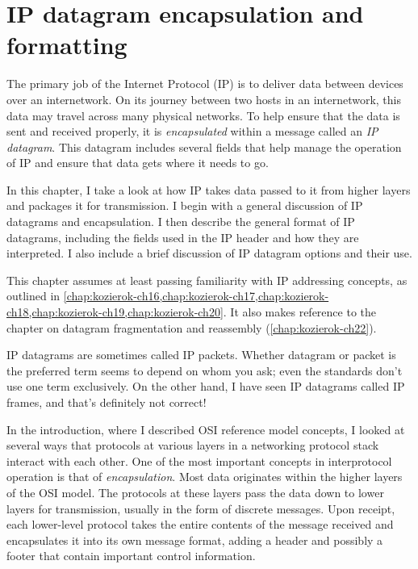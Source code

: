 \chapter{IP datagram encapsulation and formatting}
\label{chap:kozierok-ch21}


The primary job of the Internet Protocol (IP) is to deliver data between
devices over an internetwork. On its journey between two hosts in an
internetwork, this data may travel across many physical networks. To
help ensure that the data is sent and received properly, it is
\emph{encapsulated} within a message called an \emph{IP datagram}.
This datagram includes several fields that help manage the operation of
IP and ensure that data gets where it needs to go.

In this chapter, I take a look at how IP takes data passed to it from
higher layers and packages it for transmission. I begin with a general
discussion of IP datagrams and encapsulation. I then describe the
general format of IP datagrams, including the fields used in the IP
header and how they are interpreted. I also include a brief discussion
of IP datagram options and their use.


\begin{backgroundinfo}
This chapter assumes at least passing familiarity with IP addressing concepts, as outlined in
\cref{chap:kozierok-ch16,chap:kozierok-ch17,chap:kozierok-ch18,chap:kozierok-ch19,chap:kozierok-ch20}.
It also makes reference to the chapter on datagram fragmentation and reassembly (\cref{chap:kozierok-ch22}).
\end{backgroundinfo}


\begin{note}
IP datagrams are sometimes called IP packets.
Whether datagram or packet is the preferred term seems to depend on whom you ask; even the standards don't use one term exclusively.
On the other hand, I have seen IP datagrams called IP frames, and that's definitely not correct!
\end{note}


In the introduction, where I described
OSI reference model concepts, I looked at several ways that protocols at various
layers in a networking protocol stack interact with each other.
One of the most important concepts in interprotocol operation is that of \emph{encapsulation}.
Most data originates within the higher layers of the OSI model.
The protocols at these layers pass the data down to lower layers for transmission, usually in the form of discrete messages.
Upon receipt, each lower-level protocol takes the entire contents of the message received and encapsulates it into its own message format, adding
a header and possibly a footer that contain important control information.

